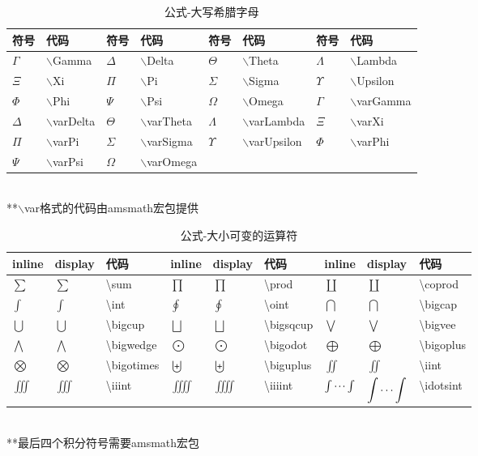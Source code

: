 \documentclass[UTF8,fontset=ubuntu]{ctexbook}
\begin{document}
\begin{table}[H]
\begin{tabular}{l l l l l l l l}
	\hline
	符号 & 代码 & 符号 & 代码 & 符号 & 代码 & 符号 & 代码\\
	\hline
	$\Gamma$ & $\backslash$Gamma & $\Delta$ & $\backslash$Delta & $\Theta$ & $\backslash$Theta & $\Lambda$ & $\backslash$Lambda\\
	$\Xi$ & $\backslash$Xi & $\Pi$ & $\backslash$Pi & $\Sigma$ & $\backslash$Sigma & $\Upsilon$ & $\backslash$Upsilon\\
	$\Phi$ & $\backslash$Phi & $\Psi$ & $\backslash$Psi & $\Omega$ & $\backslash$Omega & $\varGamma$ & $\backslash$varGamma\\
	$\varDelta$ & $\backslash$varDelta & $\varTheta$ & $\backslash$varTheta & $\varLambda$ & $\backslash$varLambda & $\varXi$ & $\backslash$varXi\\
	$\varPi$ & $\backslash$varPi & $\varSigma$ & $\backslash$varSigma & $\varUpsilon$ & $\backslash$varUpsilon & $\varPhi$ & $\backslash$varPhi\\
	$\varPsi$ & $\backslash$varPsi & $\varOmega$ & $\backslash$varOmega\\
	\hline
\end{tabular}\\[2mm]
**$\backslash$var格式的代码由amsmath宏包提供
\caption{公式-大写希腊字母}
\end{table}

\begin{table}[H]
\begin{tabular}{l l l l l l l l l}
    \hline
    inline & display & 代码 & inline & display & 代码 & inline & display & 代码\\
    \hline
    $\sum$ & $\displaystyle\sum$ & \textbackslash sum & $\prod$ & $\displaystyle\prod$ & \textbackslash prod & $\coprod$ & $\displaystyle\coprod$ & \textbackslash coprod\\
    $\int$ & $\displaystyle\int$ & \textbackslash int & $\oint$ & $\displaystyle\oint$ & \textbackslash oint & $\bigcap$ & $\displaystyle\bigcap$ & \textbackslash bigcap\\
    $\bigcup$ & $\displaystyle\bigcup$ & \textbackslash bigcup & $\bigsqcup$ & $\displaystyle\bigsqcup$ & \textbackslash bigsqcup & $\bigvee$ & $\displaystyle\bigvee$ & \textbackslash bigvee\\
    $\bigwedge$ & $\displaystyle\bigwedge$ & \textbackslash bigwedge & $\bigodot$ & $\displaystyle\bigodot$ & \textbackslash bigodot & $\bigoplus$ & $\displaystyle\bigoplus$ & \textbackslash bigoplus\\
    $\bigotimes$ & $\displaystyle\bigotimes$ & \textbackslash bigotimes & $\biguplus$ & $\displaystyle\biguplus$ & \textbackslash biguplus & $\iint$ & $\displaystyle\iint$ & \textbackslash iint\\
    $\iiint$ & $\displaystyle\iiint$ & \textbackslash iiint & $\iiiint$ & $\displaystyle\iiiint$ & \textbackslash iiiint & $\idotsint$ & $\displaystyle\idotsint$ & \textbackslash idotsint\\
	\hline
\end{tabular}\\[2mm]
**最后四个积分符号需要amsmath宏包
\caption{公式-大小可变的运算符}
\end{table}
\end{document}
